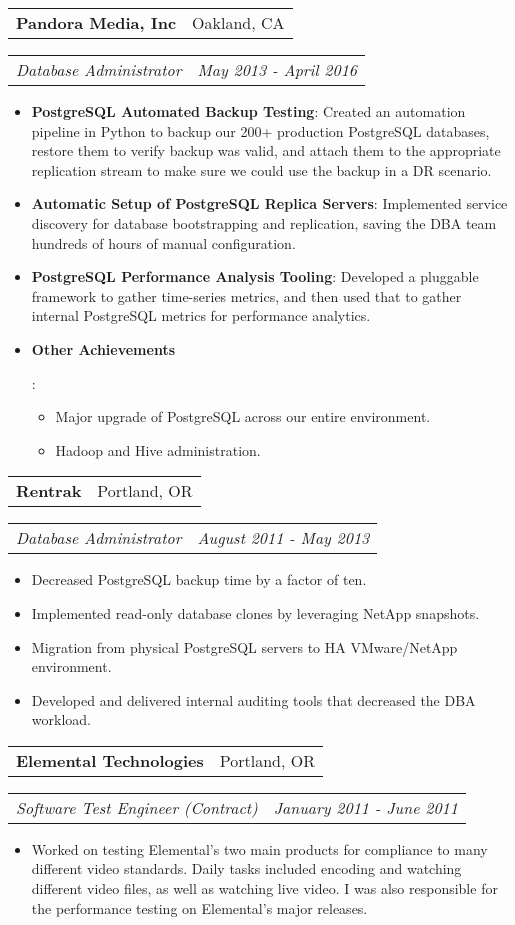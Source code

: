 \documentclass[letterpaper,11pt]{article}
\makeatletter
\newcommand{\resumeItem}[2]{
  \item\small{
    \textbf{#1}{: #2 \vspace{-2pt}}
  }
}
\newcommand{\resumeSubheading}[2]{
  \vspace{-1pt}\item
    \begin{tabular*}{0.97\textwidth}{l@{\extracolsep{\fill}}r}
      \textbf{#1} & #2 \\
    \end{tabular*}
}
\newcommand{\resumeSubtitle}[2]{
  \vspace{-1pt}
    \begin{tabular*}{0.97\textwidth}{l@{\extracolsep{\fill}}r}
      \textit{\small#1} & \textit{\small #2} \\
    \end{tabular*}\vspace{-5pt}
}
\newcommand{\resumeItemListStart}{\begin{itemize}}
\newcommand{\resumeItemListEnd}{\end{itemize}\vspace{-5pt}}
\makeatother
\begin{document}
    \vspace{15pt}
    \resumeSubheading
      {Pandora Media, Inc}{Oakland, CA}
    \resumeSubtitle
      {Database Administrator}{May 2013 - April 2016}
      \resumeItemListStart
        \resumeItem{PostgreSQL Automated Backup Testing}
          {Created an automation pipeline in Python to backup our 200+ production PostgreSQL databases, restore them to verify backup was valid, and attach them to the appropriate replication stream to make sure we could use the backup in a DR scenario.}
        \resumeItem{Automatic Setup of PostgreSQL Replica Servers}
          {Implemented service discovery for database bootstrapping and replication, saving the DBA team hundreds of hours of manual configuration.}
        \resumeItem{PostgreSQL Performance Analysis Tooling}
          {Developed a pluggable framework to gather time-series metrics, and then used that to gather internal PostgreSQL metrics for performance analytics.}
        \resumeItem{Other Achievements}
          {
            \begin{itemize}[noitemsep]
            \item Major upgrade of PostgreSQL across our entire environment.
            \item Hadoop and Hive administration.
            \end{itemize}
          }
      \resumeItemListEnd

    \vspace{15pt}
    \resumeSubheading
      {Rentrak}{Portland, OR}
    \resumeSubtitle
      {Database Administrator}{August 2011 - May 2013}
        \begin{itemize}[noitemsep]
        \item Decreased PostgreSQL backup time by a factor of ten.
        \item Implemented read-only database clones by leveraging NetApp snapshots.
        \item Migration from physical PostgreSQL servers to HA VMware/NetApp environment.
        \item Developed and delivered internal auditing tools that decreased the DBA workload.
        \end{itemize}

    \vspace{15pt}
    \resumeSubheading
      {Elemental Technologies}{Portland, OR}
    \resumeSubtitle
      {Software Test Engineer (Contract)}{January 2011 - June 2011}
        \begin{itemize}[noitemsep]
        \item Worked on testing Elemental's two main products for compliance to many different video standards. Daily tasks included encoding and watching different video files, as well as watching live video. I was also responsible for the performance testing on Elemental's major releases.
         \end{itemize}
\end{document}
